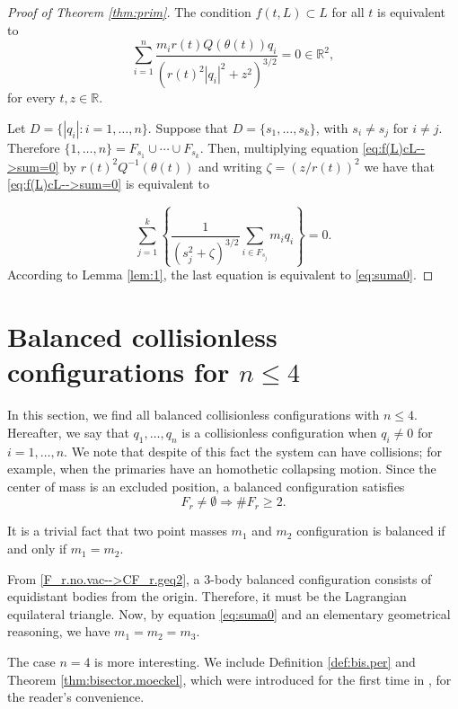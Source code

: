 \documentclass[smallcondensed]{svjour3}
\newcommand{\rr}{\mathbb{R}}
\begin{document}
\begin{proof}[Proof of Theorem \ref{thm:prim}]
The condition $f(t,L)\subset L$ for all $t$ is equivalent to
\begin{equation}\label{eq:f(L)cL-->sum=0}
 \sum_{i=1}^n\frac{m_ir(t)Q(\theta (t))q_i}{\left(r(t)^2|q_i|^2+z^2\right)^{3/2}}=0\in\rr^2,
\end{equation}
for every $t,z\in \rr$.

Let $D=\{|q_i|: i=1,\ldots,n\}$.  Suppose that $D=\{s_1,\ldots,s_k\}$, with $s_i\neq s_j$ for $i\neq j$.  Therefore $\{1,\ldots,n\}=F_{s_1}\cup \cdots\cup F_{s_k}$. Then, multiplying equation \eqref{eq:f(L)cL-->sum=0} by $r(t)^2Q^{-1}(\theta(t))$  and writing $\zeta=(z/r(t))^2$ we have that \eqref{eq:f(L)cL-->sum=0} is equivalent to


\[\sum_{j=1}^k\left\{\frac{1}{(s_j^{2}+\zeta)^{3/2}}\sum_{i\in F_{s_j}}m_iq_i\right\}=0.\]
According to Lemma \ref{lem:1}, the last equation is equivalent to \eqref{eq:suma0}.
\end{proof}


\section{Balanced collisionless configurations for $n\leq 4$}\label{sec:addmisibles}

In this section, we find all balanced collisionless configurations with $n\leq 4$. Hereafter,  we say that   $q_1,\ldots,q_n$ is a collisionless configuration  when $q_i\neq 0$ for $i=1,\ldots,n$. We note that despite of this fact the system can have collisions; for example,  when the primaries have an homothetic collapsing motion.  Since the center of mass is an excluded position, a balanced configuration satisfies
\begin{equation}\label{F_r.no.vac-->CF_r.geq2}
 F_r\neq \emptyset \Rightarrow \# F_r\geq 2.
\end{equation}



It is a trivial fact that  two point masses $m_1$ and $m_2$ configuration is balanced if and only if $m_1=m_2$.

From \eqref{F_r.no.vac-->CF_r.geq2}, a $3$-body balanced configuration consists of equidistant  bodies from the origin. Therefore, it must  be the Lagrangian equilateral triangle. Now, by equation \eqref{eq:suma0} and an elementary geometrical reasoning,   we have  $m_1=m_2=m_3$.

The case $n=4$ is more interesting. We include Definition \ref{def:bis.per} and Theorem \ref{thm:bisector.moeckel}, which were introduced  for the first time in  \cite{moeckel1990central}, for the reader's convenience.
\end{document}
